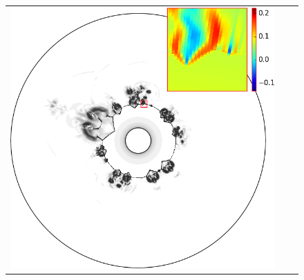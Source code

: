 \documentclass[preprint, 11pt]{article}
\begin{document}
\begin{figure}[!h]
{\begin{tabular}{ccc}
      \includegraphics[scale=0.3]{figures/chj_r1_roe_p3.png}
    \end{tabular}
  }
  

\end{figure}
\end{document}
